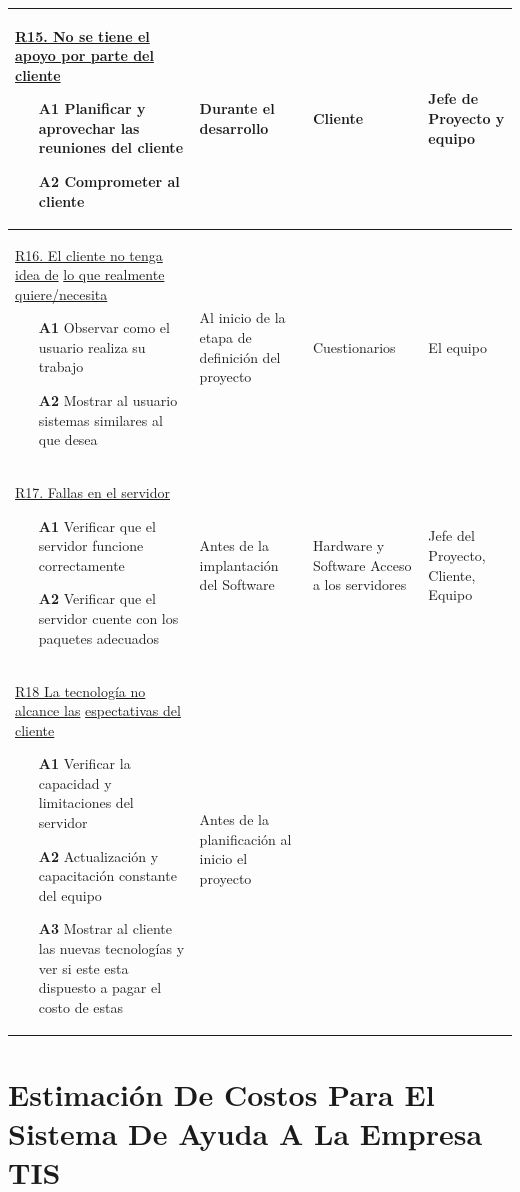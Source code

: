 \documentclass[11pt,letterpaper]{report}
\begin{document}
\begin{longtable}{|l|p{1in}| p{1in} |p{0.7in}|}
	 \begin{minipage}{2.5in}
		\vskip 6pt
	  	\underline{R15. No se tiene el apoyo por parte del }
	  	\underline{cliente}
	  \begin{itemize}
	   		\item[{\bf A1}] Planificar y aprovechar las reuniones del cliente
	   		\item[{\bf A2}] Comprometer al cliente
	  \end{itemize}
		   	\vskip 1pt
	 \end{minipage}	
		& Durante el desarrollo	& Cliente	& Jefe de  Proyecto y equipo\\\hline


	 \begin{minipage}{2.5in}
		\vskip 6pt
	  	\underline{R16. El cliente no tenga idea de}
	  	\underline{lo que realmente quiere/necesita}
	  \begin{itemize}
	   		\item[{\bf A1}] Observar como el usuario realiza su trabajo
	   		\item[{\bf A2}] Mostrar al usuario sistemas similares al que desea
	  \end{itemize}
		   	\vskip 1pt
	 \end{minipage}	
		& Al inicio de la etapa de definición del proyecto & Cuestionarios & El equipo\\\hline	
		
	 \begin{minipage}{2.5in}
		\vskip 6pt
	  	\underline{R17. Fallas en el servidor}
	 	\begin{itemize}
	   		\item[{\bf A1}] Verificar que el servidor funcione correctamente
	   		\item[{\bf A2}] Verificar que el servidor cuente con los paquetes adecuados
	 	\end{itemize}
		\vskip 1pt
	 \end{minipage}	
			& Antes de la implantación del Software	& Hardware y Software Acceso a los servidores & Jefe del Proyecto, Cliente, Equipo\\\hline	

	 \begin{minipage}{2.5in}
		\vskip 6pt
	  	\underline{R18 La tecnología no alcance las}
	  	\underline{ espectativas del cliente }
	 	\begin{itemize}
	   		\item[{\bf A1}] Verificar la capacidad y limitaciones del servidor 
	   		\item[{\bf A2}] Actualización y capacitación constante del equipo
	   		\item[{\bf A3}] Mostrar al cliente las nuevas tecnologías y ver si este esta dispuesto a pagar el costo de estas
	 	\end{itemize}
		\vskip 1pt
	 \end{minipage}	
			& Antes de la planificación al inicio el proyecto & &		\\\hline			


\end{longtable}
\section{Estimación De Costos Para El Sistema De Ayuda A La Empresa TIS}
\end{document}
